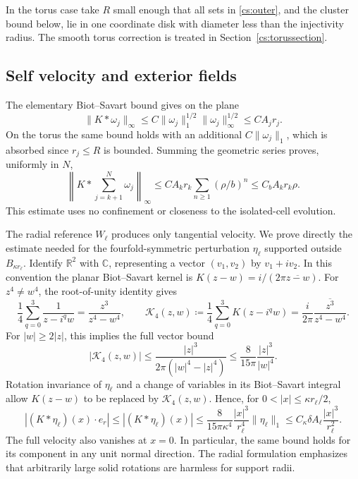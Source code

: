 \documentclass[11pt]{amsart}
\theoremstyle{remark}
\numberwithin{equation}{section}
\newcommand{\R}{\mathbb R}
\newcommand{\C}{\mathbb C}
\begin{document}
In the torus case take $R$ small enough that all sets in \eqref{cs:outer}, and the cluster bound below, lie in one coordinate disk with diameter less than the injectivity radius. The smooth torus correction is treated in Section~\ref{cs:torussection}.

\subsection{Self velocity and exterior fields}
The elementary Biot--Savart bound gives on the plane
\[
 \|K*\omega_j\|_\infty\le C\|\omega_j\|_1^{1/2}\|\omega_j\|_\infty^{1/2}
 \le CA_jr_j.
\]
On the torus the same bound holds with an additional $C\|\omega_j\|_1$, which is absorbed since $r_j\le R$ is bounded. Summing the geometric series proves, uniformly in $N$,
\begin{equation}\label{cs:clusterU}
 \left\|K*\sum_{j=k+1}^N\omega_j\right\|_\infty
 \le CA_kr_k\sum_{n\ge1}(\rho/b)^n
 \le C_b A_kr_k\rho.
\end{equation}
This estimate uses no confinement or closeness to the isolated-cell evolution.

The radial reference $W_\ell$ produces only tangential velocity.
We prove directly the estimate needed for the fourfold-symmetric
perturbation $\eta_\ell$ supported outside $B_{\kappa r_\ell}$.
Identify $\R^2$ with $\C$, representing a vector $(v_1,v_2)$ by
$v_1+iv_2$.  In this convention the planar Biot--Savart kernel is
$K(z-w)=i/(2\pi\overline{z-w})$.
For $z^4\ne w^4$, the root-of-unity identity gives
\begin{equation}\label{cs:fourfoldkernel}
 \frac14\sum_{q=0}^3\frac{1}{z-i^qw}
 =\frac{z^3}{z^4-w^4},\qquad
 \mathcal K_4(z,w)\coloneqq\frac14\sum_{q=0}^3K(z-i^qw)
 =\frac{i}{2\pi}\overline{\frac{z^3}{z^4-w^4}}.
\end{equation}
For $|w|\ge2|z|$, this implies the full vector bound
\begin{equation}\label{cs:fourfoldpointwise}
 |\mathcal K_4(z,w)|
 \le\frac{|z|^3}{2\pi(|w|^4-|z|^4)}
 \le\frac{8}{15\pi}\frac{|z|^3}{|w|^4}.
\end{equation}
Rotation invariance of $\eta_\ell$ and a change of variables in
its Biot--Savart integral allow $K(z-w)$ to be replaced by
$\mathcal K_4(z,w)$.  Hence, for $0<|x|\le\kappa r_\ell/2$,
\[
 |(K*\eta_\ell)(x)\cdot e_r|
 \le |(K*\eta_\ell)(x)|
 \le\frac{8}{15\pi\kappa^4}
       \frac{|x|^3}{r_\ell^4}\|\eta_\ell\|_1
 \le C_\kappa\delta A_\ell\frac{|x|^3}{r_\ell^2}.
\]
The full velocity also vanishes at $x=0$.  In particular, the same
bound holds for its component in any unit normal direction.
The radial formulation emphasizes that arbitrarily large solid
rotations are harmless for support radii.
\end{document}
